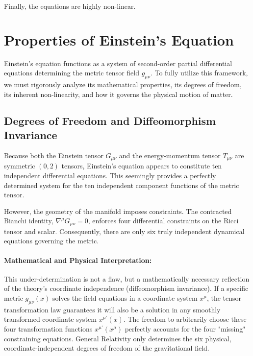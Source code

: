 \documentclass[11pt, a4paper]{report}
\begin{document}
Finally, the equations are highly non-linear. %
\section{Properties of Einstein's Equation}

Einstein's equation functions as a system of second-order partial differential equations determining the metric tensor field $g_{\mu\nu}$. To fully utilize this framework, we must rigorously analyze its mathematical properties, its degrees of freedom, its inherent non-linearity, and how it governs the physical motion of matter.

\subsection{Degrees of Freedom and Diffeomorphism Invariance}

Because both the Einstein tensor $G_{\mu\nu}$ and the energy-momentum tensor $T_{\mu\nu}$ are symmetric $(0,2)$ tensors, Einstein's equation appears to constitute ten independent differential equations. This seemingly provides a perfectly determined system for the ten independent component functions of the metric tensor. 

However, the geometry of the manifold imposes constraints. The contracted Bianchi identity, $\nabla^{\mu}G_{\mu\nu} = 0$, enforces four differential constraints on the Ricci tensor and scalar. Consequently, there are only six truly independent dynamical equations governing the metric.

\paragraph{Mathematical and Physical Interpretation:} 
This under-determination is not a flaw, but a mathematically necessary reflection of the theory's coordinate independence (diffeomorphism invariance). If a specific metric $g_{\mu\nu}(x)$ solves the field equations in a coordinate system $x^{\mu}$, the tensor transformation law guarantees it will also be a solution in any smoothly transformed coordinate system $x^{\mu'}(x)$. The freedom to arbitrarily choose these four transformation functions $x^{\mu'}(x^{\mu})$ perfectly accounts for the four "missing" constraining equations. General Relativity only determines the six physical, coordinate-independent degrees of freedom of the gravitational field.
\end{document}
